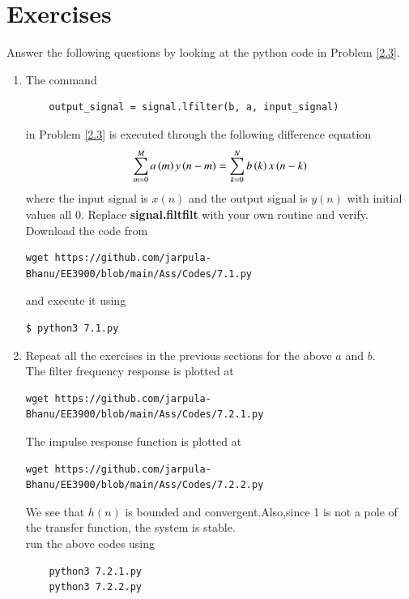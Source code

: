 \documentclass[journal,12pt,twocolumn]{IEEEtran}
\renewcommand\thesection{\arabic{section}}
\begin{document}
\section{Exercises}
Answer the following questions by looking at the python code in Problem \ref{2.3}.
\begin{enumerate}[label=\thesection.\arabic*]
\item
The command
\begin{lstlisting}
	output_signal = signal.lfilter(b, a, input_signal)
	\end{lstlisting}
in Problem \ref{2.3} is executed through the following difference equation
\begin{equation}
\label{eq:iir_filter_gen}
 \sum _{m=0}^{M}a\left(m\right)y\left(n-m\right)=\sum _{k=0}^{N}b\left(k\right)x\left(n-k\right)
\end{equation}
%
where the input signal is $x(n)$ and the output signal is $y(n)$ with initial values all 0. Replace
\textbf{signal.filtfilt} with your own routine and verify.\\
\solution  \solution Download the code from
\begin{lstlisting}
wget https://github.com/jarpula-Bhanu/EE3900/blob/main/Ass/Codes/7.1.py
\end{lstlisting}
and execute it using
\begin{lstlisting}
$ python3 7.1.py
\end{lstlisting}
%
\item Repeat all the exercises in the previous sections for the above $a$ and $b$.\\
\solution The filter frequency  response is plotted at 
\begin{lstlisting}
wget https://github.com/jarpula-Bhanu/EE3900/blob/main/Ass/Codes/7.2.1.py
\end{lstlisting}
The impulse response function is plotted at 
\begin{lstlisting}
wget https://github.com/jarpula-Bhanu/EE3900/blob/main/Ass/Codes/7.2.2.py
\end{lstlisting}
We see that $h(n)$ is bounded and convergent.Also,since 1 is not a pole of the transfer function, the system is stable.\\
run the above codes using
\begin{lstlisting}
	python3 7.2.1.py
	python3 7.2.2.py
\end{lstlisting}
\begin{figure}[!ht]
\centering

\end{figure}
\end{enumerate}
\end{document}
